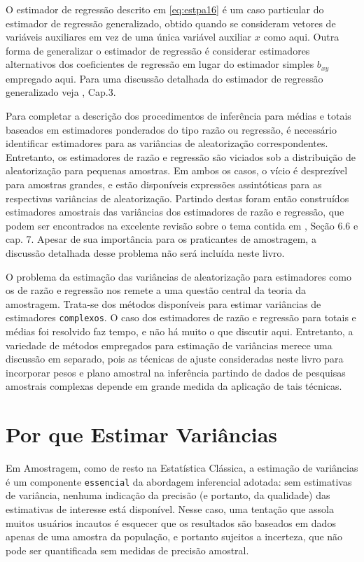 \documentclass[]{book}
\theoremstyle{definition}
\theoremstyle{definition}
\theoremstyle{definition}
\theoremstyle{remark}
\begin{document}
O estimador de regressão descrito em \eqref{eq:estpa16} é um caso
particular do estimador de regressão generalizado, obtido quando se
consideram vetores de variáveis auxiliares em vez de uma única variável
auxiliar \(x\) como aqui. Outra forma de generalizar o estimador de
regressão é considerar estimadores alternativos dos coeficientes de
regressão em lugar do estimador simples \(b_{xy}\) empregado aqui. Para
uma discussão detalhada do estimador de regressão generalizado veja
\citep{Silva}, Cap.3.

Para completar a descrição dos procedimentos de inferência para médias e
totais baseados em estimadores ponderados do tipo razão ou regressão, é
necessário identificar estimadores para as variâncias de aleatorização
correspondentes. Entretanto, os estimadores de razão e regressão são
viciados sob a distribuição de aleatorização para pequenas amostras. Em
ambos os casos, o vício é desprezível para amostras grandes, e estão
disponíveis expressões assintóticas para as respectivas variâncias de
aleatorização. Partindo destas foram então construídos estimadores
amostrais das variâncias dos estimadores de razão e regressão, que podem
ser encontrados na excelente revisão sobre o tema contida em
\citep{SSW92}, Seção 6.6 e cap. 7. Apesar de sua importância para os
praticantes de amostragem, a discussão detalhada desse problema não será
incluída neste livro.

O problema da estimação das variâncias de aleatorização para estimadores
como os de razão e regressão nos remete a uma questão central da teoria
da amostragem. Trata-se dos métodos disponíveis para estimar variâncias
de estimadores \texttt{complexos}. O caso dos estimadores de razão e
regressão para totais e médias foi resolvido faz tempo, e não há muito o
que discutir aqui. Entretanto, a variedade de métodos empregados para
estimação de variâncias merece uma discussão em separado, pois as
técnicas de ajuste consideradas neste livro para incorporar pesos e
plano amostral na inferência partindo de dados de pesquisas amostrais
complexas depende em grande medida da aplicação de tais técnicas.

\section{Por que Estimar Variâncias}\label{por-que-estimar-variancias}

Em Amostragem, como de resto na Estatística Clássica, a estimação de
variâncias é um componente \texttt{essencial} da abordagem inferencial
adotada: sem estimativas de variância, nenhuma indicação da precisão (e
portanto, da qualidade) das estimativas de interesse está disponível.
Nesse caso, uma tentação que assola muitos usuários incautos é esquecer
que os resultados são baseados em dados apenas de uma amostra da
população, e portanto sujeitos a incerteza, que não pode ser
quantificada sem medidas de precisão amostral.
\end{document}
